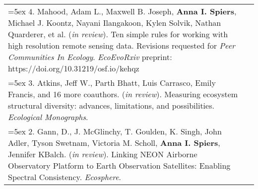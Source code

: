 \begin{longtable}{@{} >{\raggedright}p{6.10in} >{\raggedleft}X @{}}

\hangindent=5ex 4. Mahood, Adam L., Maxwell B. Joseph, \textbf{Anna I. Spiers}, Michael J. Koontz, Nayani Ilangakoon, Kylen Solvik, Nathan Quarderer, et al. (\emph{in review}). Ten simple rules for working with high resolution remote sensing data. Revisions requested for \emph{Peer Communities In Ecology}.
\newline \emph{EcoEvoRxiv} preprint: https://doi.org/10.31219/osf.io/kehqz & \tabularnewline

\hangindent=5ex 3. Atkins, Jeff W., Parth Bhatt, Luis Carrasco, Emily Francis, and 16 more coauthors. (\emph{in review}). Measuring ecosystem structural diversity: advances, limitations, and possibilities. \emph{Ecological Monographs}.  &  \tabularnewline

\hangindent=5ex 2. Gann, D., J. McGlinchy, T. Goulden, K. Singh, John Adler, Tyson Swetnam, Victoria M. Scholl, \textbf{Anna I. Spiers}, Jennifer KBalch. (\emph{in review}). Linking NEON Airborne Observatory Platform to Earth Observation Satellites: Enabling Spectral Consistency. \emph{Ecosphere}.  & \tabularnewline


\end{longtable}

